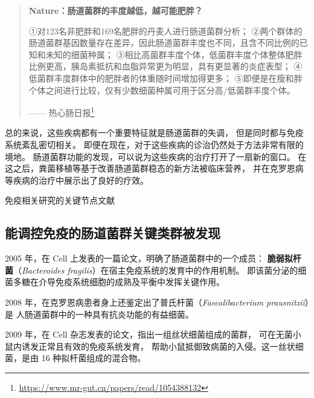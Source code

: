 \documentclass[]{ctexbook}
\renewcommand{\href}[2]{#2\footnote{\url{#1}}}
\begin{document}
\begin{quote}
\textbf{Nature：肠道菌群的丰度越低，越可能肥胖？}

①对123名非肥胖和169名肥胖的丹麦人进行肠道菌群分析；
②两个群体的肠道菌群基因数量存在差异，因此肠道菌群丰度也不同，且含不同比例的已知和未知的细菌种属；
③相比高菌群丰度个体，低菌群丰度个体整体肥胖比例更高，胰岛素抵抗和血脂异常更为明显，具有更显著的炎症表型；
④低菌群丰度群体中的肥胖者的体重随时间增加得更多；
⑤即便是在瘦和胖个体之间进行比较，仅有少数细菌种属可用于区分高/低菌群丰度个体。

\begin{flushright}------ \href{https://www.mr-gut.cn/papers/read/1054388132}{热心肠日报}\end{flushright}
\end{quote}

总的来说，这些疾病都有一个重要特征就是肠道菌群的失调，
但是同时都与免疫系统紊乱密切相关。
即便在现在，对于这些疾病的诊治仍然处于方法非常有限的境地。
肠道菌群功能的发现，可以说为这些疾病的治疗打开了一扇新的窗口。
在这之后，粪菌移植等基于改善肠道菌群稳态的新方法被临床营养，
并在克罗恩病等疾病的治疗中展示出了良好的疗效。

\hypertarget{htmlwidget-c245ebf8b75e0d387517}{}

\label{fig:immunity-histplot-articles}免疫相关研究的关键节点文献

\hypertarget{ux80fdux8c03ux63a7ux514dux75abux7684ux80a0ux9053ux83ccux7fa4ux5173ux952eux7c7bux7fa4ux88abux53d1ux73b0}{%
\subsection{能调控免疫的肠道菌群关键类群被发现}\label{ux80fdux8c03ux63a7ux514dux75abux7684ux80a0ux9053ux83ccux7fa4ux5173ux952eux7c7bux7fa4ux88abux53d1ux73b0}}

2005 年，在 Cell 上发表的一篇论文，明确了肠道菌群中的一个成员：
\textbf{脆弱拟杆菌}（\emph{Bacteroides fragilis}）在宿主免疫系统的发育中的作用机制。
即该菌分泌的细菌多糖在介导免疫系统细胞的成熟及平衡中发挥关键作用\citep{mazmanianImmunomodulatoryMoleculeSymbiotic2005}。

2008 年，在克罗恩病患者身上还鉴定出了普氏杆菌（\emph{Faecalibacterium prausnitzii}）是
人肠道菌群中的一种具有抗炎功能的有益细菌\citep{sokolFaecalibacteriumPrausnitziiAntiinflammatory2008}。

2009 年，在 Cell 杂志发表的论文，指出一组丝状细菌组成的菌群，
可在无菌小鼠内诱发正常且有效的免疫系统发育，
帮助小鼠抵御致病菌的入侵。这一丝状细菌，是由 16 种拟杆菌组成的混合物\citep{ivanovInductionIntestinalTh172009}。
\end{document}
